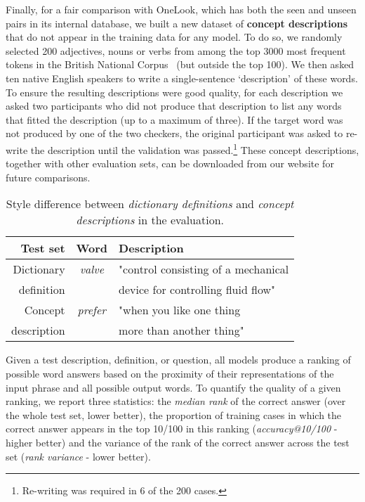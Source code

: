 \documentclass[11pt,letterpaper]{article}
\begin{document}
Finally, for a fair comparison with OneLook, which has both the seen and unseen pairs in its internal database, we built a new dataset of {\bf concept descriptions} that do not appear in the training data for any model. To do so, we randomly selected 200 adjectives, nouns or verbs from among the top 3000 most frequent tokens in the British National Corpus~\cite{leech1994claws4} (but outside the top 100). We then asked ten native English speakers to write a single-sentence `description' of these words. To ensure the resulting descriptions were good quality, for each description we asked two participants who did not produce that description to list any words that fitted the description (up to a maximum of three). If the target word was not produced by one of the two checkers, the original participant was asked to re-write the description until the validation was passed.\footnote{Re-writing was required in 6 of the 200 cases.} These concept descriptions, together with other evaluation sets, can be downloaded from our website for future comparisons.

\begin{table}[ht]
{\small
\emph
\hfill{}
\begin{tabular}{r|cl}
\bf Test set & \bf Word & \bf Description \\
\hline
 Dictionary &   \emph{valve} & "control consisting of a mechanical   \\
definition  & & device for controlling fluid flow" \\ 
\rule{0pt}{2ex} 
Concept &   \emph{prefer} & "when you like one thing \\
description & & more than another thing" \\
\end{tabular}
\caption{Style difference between \emph{dictionary definitions} and \emph{concept descriptions} in the evaluation.}
\label{tb:tablename}}
\end{table}

Given a test description, definition, or question, all models produce a ranking of possible word answers based on the proximity of their representations of the input phrase and all possible output words. To quantify the quality of a given ranking, we report three statistics: the \emph{median rank} of the correct answer (over the whole test set, lower better), the proportion of training cases in which the correct answer appears in the top 10/100 in this ranking (\emph{accuracy@10/100} - higher better) and the variance of the rank of the correct answer across the test set (\emph{rank variance} - lower better). 
\end{document}
